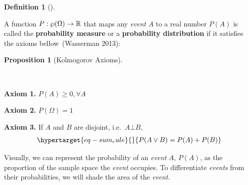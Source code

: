 \documentclass[
  letterpaper,
  12pt,
  british]{tufte-book}
\theoremstyle{plain}
\theoremstyle{plain}
\newtheorem{proposition}{Proposition}[chapter]
\theoremstyle{definition}
\newtheorem{definition}{Definition}[chapter]
\theoremstyle{remark}
\begin{document}
\leavevmode{}%
\begin{definition}[]\label{def-probability_distribution}

A function \(P: \Large\wp(\Omega) \to \mathbb{R}\) that maps any
\emph{event} \(A\) to a real number \(P(A)\) is called the
\textbf{probability measure} or a \textbf{probability distribution} if
it satisfies the axioms bellow~(Wasserman
2013):

\end{definition}

\leavevmode{}%
\begin{proposition}[Kolmogorov Axioms]\label{prp-kolmogorov_axioms}

~

\end{proposition}

\textbf{Axiom 1.} \(P(A)\geq 0, \forall A\)

\textbf{Axiom 2.} \(P(\Omega)=1\)

\textbf{Axiom 3.} If \(A\) and \(B\) are disjoint,
i.e.~\(A \bot B\),\protect\hypertarget{axiom-disjoint}{}{}
\begin{equation}\protect\hypertarget{eq-sum_rule}{}{\begin{aligned}
    P(A \lor B)= P(A)+P(B)
\end{aligned}}\label{eq-sum_rule}\end{equation}

Visually, we can represent the probability of an \emph{event} \(A\),
\(P(A)\), as the proportion of the sample space the \emph{event}
occupies. To differentiate \emph{events} from their probabilities, we
will shade the area of the \emph{event}.

\begin{figure}

\begin{minipage}[t]{\linewidth}

{\centering 

}

\end{minipage}%

\end{figure}
\end{document}
